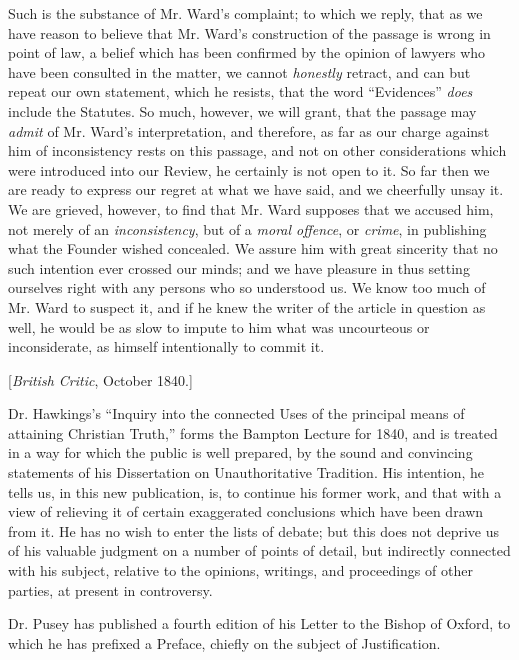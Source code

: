 Such is the substance of Mr. Ward's complaint; to
which we reply, that as we have reason to believe that Mr. Ward's
construction of the passage is wrong in point of law, a belief which has
been confirmed by the opinion of lawyers who have been consulted in the
matter, we cannot \emph{honestly} retract, and can but repeat our own
statement, which he resists, that the word ``Evidences'' \emph{does}
include the Statutes. So much, however, we will grant, that the passage
may \emph{admit} of Mr. Ward's interpretation, and therefore, as far as
our charge against him of inconsistency rests on this passage, and not
on other considerations which were introduced into our Review, he
certainly is not open to it. So far then we are ready to express our
regret at what we have said, and we cheerfully unsay it. We are grieved,
however, to find that Mr. Ward supposes that we accused him, not merely
of an \emph{inconsistency}, but of a \emph{moral offence}, or \emph{crime},
in publishing what the Founder wished concealed. We assure him with
great sincerity that no such intention ever crossed our minds; and we
have pleasure in thus setting ourselves right with any persons who so
understood us. We know too much of Mr. Ward to suspect it, and if he
knew the writer of the article in question as well, he would be as slow
to impute to him what was uncourteous or inconsiderate, as himself
intentionally to commit it.


[\emph{British Critic}, October 1840.]

Dr. Hawkings's ``Inquiry into the connected
Uses of the principal means of attaining Christian Truth,'' forms the
Bampton Lecture for 1840, and is treated in
a way for which the public is well prepared, by the sound and
convincing statements of his Dissertation on Unauthoritative Tradition.
His intention, he tells us, in this new publication, is, to continue his
former work, and that with a view of relieving it of certain exaggerated
conclusions which have been drawn from it. He has no wish to enter the
lists of debate; but this does not deprive us of his valuable judgment
on a number of points of detail, but indirectly connected with his
subject, relative to the opinions, writings, and proceedings of other
parties, at present in controversy.

Dr. Pusey has published a fourth edition of his
Letter to the Bishop of Oxford, to which he has prefixed a Preface,
chiefly on the subject of Justification.


